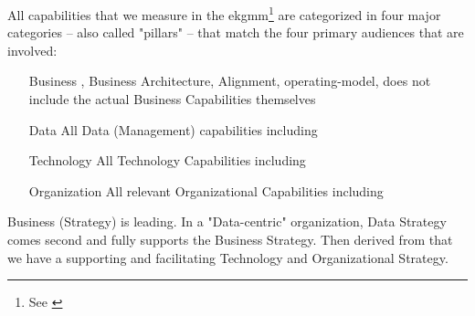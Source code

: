 All capabilities that we measure in the \gls{ekgmm}\footnote{See \cite{ekgmm}} are categorized
in four major categories -- also called "pillars" -- that match the four primary audiences that are involved:

\begin{enumerate}[leftmargin=1in,font=\bfseries]
    \item [Business]     , Business Architecture, Alignment, \Gls{operating-model},
                         does not include the actual Business Capabilities themselves
    \item [Data]         All Data (Management) capabilities including 
    \item [Technology]   All Technology Capabilities including 
    \item [Organization] All relevant Organizational Capabilities including 
\end{enumerate}

Business (Strategy) is leading.
In a "Data-centric" organization, Data Strategy comes second and fully supports the Business Strategy.
Then derived from that we have a supporting and facilitating Technology and Organizational Strategy.
